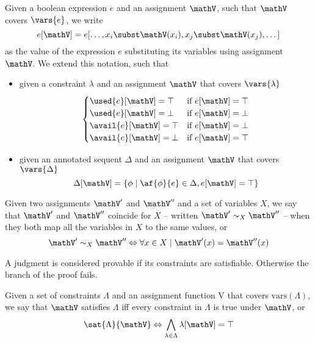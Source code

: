 \begin{define}[Evaluation]
	\label{def:evaluation}
	Given a boolean expression $e$ and an assignment $\mathV$, such that $\mathV$ covers $\vars{e}$, we write
		$$ e[\mathV] = e[\dots, x_i \subst \mathV(x_i), x_j \subst \mathV(x_j), \dots] $$
	as the value of the expression $e$ substituting its variables using assignment $\mathV$.
	We extend this notation, such that
	\begin{itemize}
		\item given a constraint $\lambda$ and an assignment $\mathV$ that covers $\vars{\lambda}$
			$$ 
			\begin{cases} 
				\used{e}[\mathV] = \top & \text{if } e[\mathV] = \top \\
				\used{e}[\mathV] = \bot & \text{if } e[\mathV] = \bot \\
				\avail{e}[\mathV] = \top & \text{if } e[\mathV] = \bot \\
				\avail{e}[\mathV] = \bot & \text{if } e[\mathV] = \top \\
			\end{cases}
			$$
		\item given an annotated sequent $\Delta$ and an assignment $\mathV$ that covers $\vars{\Delta}$
			$$ \Delta[\mathV] = \{ \phi \mid \af{\phi}{e} \in \Delta , e[\mathV] = \top \} $$
	\end{itemize}
\end{define}
\begin{define}
	\label{def:coincidence}
	Given two assignments $\mathV'$ and $\mathV''$ and a set of variables $X$, we say that $\mathV'$ and $\mathV''$ coincide for $X$ -- written $\mathV' \sim_X \mathV''$ -- when they both map all the variables in $X$ to the same values, or
	$$ \mathV' \sim_X \mathV'' \Leftrightarrow \forall x \in X \mid \mathV'(x) = \mathV''(x) $$
\end{define}

A judgment is considered provable if its constraints are satisfiable.
Otherwise the branch of the proof fails.
\begin{define}[Satisfaiability]
	\label{def:sat}
	Given a set of constraints $\Lambda$ and an assignment function V that covers $\mathrm{vars}(\Lambda)$, we say that $\mathV$ satisfies $\Lambda$ iff every constraint in $\Lambda$ is true under $\mathV$, or
	$$ \sat{\Lambda}{\mathV} \Leftrightarrow \bigwedge_{\lambda \in \Lambda} \lambda[\mathV] = \top $$
\end{define}

